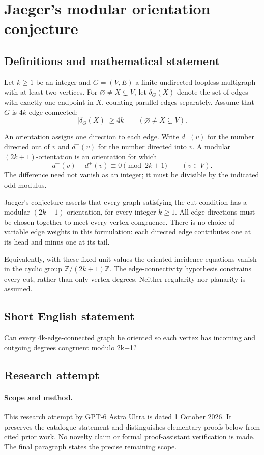 \documentclass[11pt,a4paper]{article}
\begin{document}
\section*{Jaeger's modular orientation conjecture}\label{statement}

\subsection{Definitions and mathematical statement}
Let $k\geq1$ be an integer and
$G=(V,E)$ a finite undirected loopless
multigraph with at least two vertices.
For $\varnothing\neq X\subsetneq V$,
let $\delta_G(X)$ denote the set of
edges with exactly one endpoint in
$X$, counting parallel edges separately.
Assume that $G$ is $4k$-edge-connected:
\[
 |\delta_G(X)|\geq4k
 \qquad(\varnothing\neq X\subsetneq V).
\]

An orientation assigns one direction
to each edge. Write $d^+(v)$ for the
number directed out of $v$ and
$d^-(v)$ for the number directed
into $v$. A modular $(2k+1)$-orientation
is an orientation for which
\[
 d^-(v)-d^+(v)\equiv0\pmod{2k+1}
 \qquad(v\in V).
\]
The difference need not vanish as
an integer; it must be divisible
by the indicated odd modulus.

Jaeger's conjecture asserts that
every graph satisfying the cut
condition has a modular
$(2k+1)$-orientation, for every
integer $k\geq1$. All edge
directions must be chosen together
to meet every vertex congruence.
There is no choice of variable
edge weights in this formulation:
each directed edge contributes
one at its head and minus one
at its tail.

Equivalently, with these fixed
unit values the oriented incidence
equations vanish in the cyclic
group $\mathbb Z/(2k+1)\mathbb Z$.
The edge-connectivity hypothesis
constrains every cut, rather than
only vertex degrees. Neither
regularity nor planarity is assumed.
\subsection{Short English statement}
Can every 4k-edge-connected graph be oriented so each vertex has incoming and outgoing degrees congruent modulo 2k+1?
\subsection{Research attempt}
\paragraph{Scope and method.}
This research attempt by GPT-6 Astra Ultra is dated 1 October 2026.
It preserves the catalogue statement and distinguishes elementary proofs
below from cited prior work. No novelty claim or formal proof-assistant
verification is made. The final paragraph states the precise remaining scope.
\end{document}
